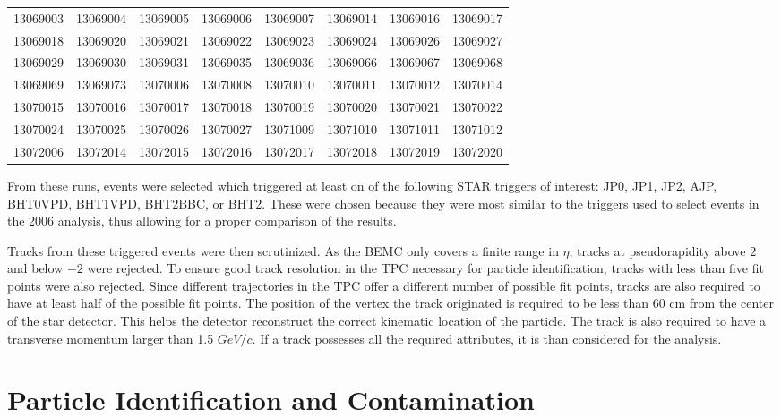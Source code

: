 \documentclass[abstract = on,listof=totoc, bibliography=totoc]{scrreprt}
\begin{document}
{\begin{longtable}{cccccccc}
13069003  &  13069004  &  13069005  &  13069006  &  13069007  &  13069014  &  13069016  &  13069017  \\ 
13069018  &  13069020  &  13069021  &  13069022  &  13069023  &  13069024  &  13069026  &  13069027  \\ 
13069029  &  13069030  &  13069031  &  13069035  &  13069036  &  13069066  &  13069067  &  13069068  \\ 
13069069  &  13069073  &  13070006  &  13070008  &  13070010  &  13070011  &  13070012  &  13070014  \\ 
13070015  &  13070016  &  13070017  &  13070018  &  13070019  &  13070020  &  13070021  &  13070022  \\ 
13070024  &  13070025  &  13070026  &  13070027  &  13071009  &  13071010  &  13071011  &  13071012  \\ 
13072006  &  13072014  &  13072015  &  13072016  &  13072017  &  13072018  &  13072019  &  13072020  \\ \hline
\end{longtable}
} 
\normalsize

From these runs, events were selected which triggered at least on of the following STAR triggers of interest: JP0, JP1, JP2, AJP, BHT0VPD, BHT1VPD, BHT2BBC, or BHT2. These were chosen because they were most similar to the triggers used to select events in the 2006 analysis, thus allowing for a proper comparison of the results.

Tracks from these triggered events were then scrutinized. As the BEMC only covers a finite range in $\eta$, tracks at pseudorapidity above $2$ and below $-2$ were rejected. To ensure good track resolution in the TPC necessary for particle identification, tracks with less than five fit points were also rejected. Since different trajectories in the TPC offer a different number of possible fit points, tracks are also required to have at least half of the possible fit points. The position of the vertex the track originated is required to be less than 60 cm from the center of the star detector. This helps the detector reconstruct the correct kinematic location of the particle. The track is also required to have a transverse momentum larger than 1.5 $GeV/c$. If a track possesses all the required attributes, it is than considered for the analysis.


\section{Particle Identification and Contamination}
\end{document}
